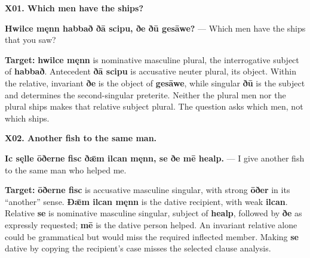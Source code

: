 \par\begin{minipage}{\linewidth}\raggedright
\textbf{X01. Which men have the ships?}

\textbf{Hwilce męnn habbað ðā scipu, ðe ðū gesāwe?} — Which men have the ships that you saw?

\textbf{Target:} \textbf{hwilce męnn} is nominative masculine plural, the interrogative subject of \textbf{habbað}. Antecedent \textbf{ðā scipu} is accusative neuter plural, its object. Within the relative, invariant \textbf{ðe} is the object of \textbf{gesāwe}, while singular \textbf{ðū} is the subject and determines the second-singular preterite. Neither the plural men nor the plural ships makes that relative subject plural. The question asks which men, not which ships.

\end{minipage}\par\addvspace{4pt}

\par\begin{minipage}{\linewidth}\raggedright
\textbf{X02. Another fish to the same man.}

\textbf{Ic sęlle ōðerne fisc ðǣm ilcan męnn, se ðe mē healp.} — I give another fish to the same man who helped me.

\textbf{Target:} \textbf{ōðerne fisc} is accusative masculine singular, with strong \textbf{ōðer} in its “another” sense. \textbf{Ðǣm ilcan męnn} is the dative recipient, with weak \textbf{ilcan}. Relative \textbf{se} is nominative masculine singular, subject of \textbf{healp}, followed by \textbf{ðe} as expressly requested; \textbf{mē} is the dative person helped. An invariant relative alone could be grammatical but would miss the required inflected member. Making \textbf{se} dative by copying the recipient's case misses the selected clause analysis.

\end{minipage}\par\addvspace{4pt}

